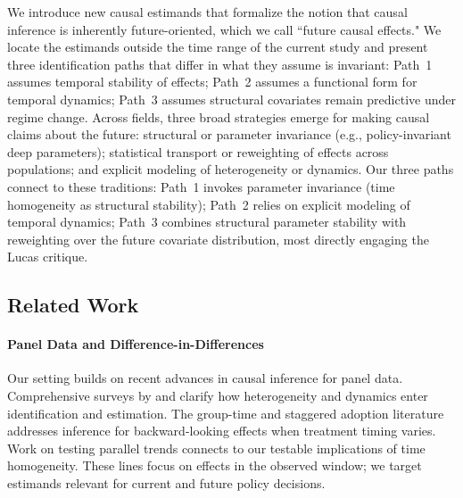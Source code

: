 \documentclass{article}
\begin{document}
We introduce new causal estimands that formalize the notion that causal inference is inherently future-oriented, which we call ``future causal effects." We locate the estimands outside the time range of the current study and present three identification paths that differ in what they assume is invariant: Path~1 assumes temporal stability of effects; Path~2 assumes a functional form for temporal dynamics; Path~3 assumes structural covariates remain predictive under regime change. Across fields, three broad strategies emerge for making causal claims about the future: structural or parameter invariance (e.g., policy-invariant deep parameters); statistical transport or reweighting of effects across populations; and explicit modeling of heterogeneity or dynamics. Our three paths connect to these traditions: Path~1 invokes parameter invariance (time homogeneity as structural stability); Path~2 relies on explicit modeling of temporal dynamics; Path~3 combines structural parameter stability with reweighting over the future covariate distribution, most directly engaging the Lucas critique.


\subsection*{Related Work}


\paragraph{Panel Data and Difference-in-Differences}

Our setting builds on recent advances in causal inference for panel data. Comprehensive surveys by \citet{arkhangelskyCausalModelsLongitudinal2024} and \citet{dechaisemartinTwowayFixedEffects2023} clarify how heterogeneity and dynamics enter identification and estimation. The group-time and staggered adoption literature \citep{callawayDifferenceindifferencesMultipleTime2021,sunEstimatingDynamicTreatment2021,rothEfficientEstimationStaggered2023} addresses inference for backward-looking effects when treatment timing varies. Work on testing parallel trends \citep{freyaldenhovenPreeventTrendsPanel2019,rothPretestCautionEventstudy2022,rambachanMoreCredibleApproach2023,detteTestingEquivalencePreTrends2024} connects to our testable implications of time homogeneity. These lines focus on effects in the observed window; we target estimands relevant for current and future policy decisions.
\end{document}
